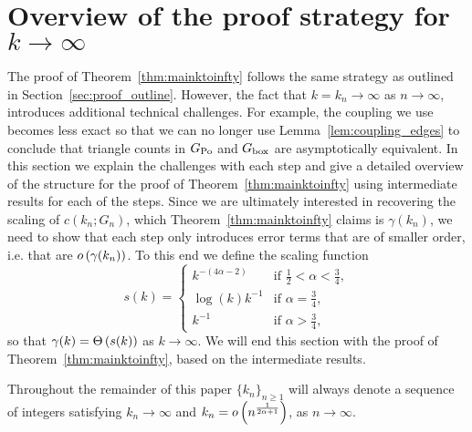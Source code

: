 
\section{Overview of the proof strategy for $k \to \infty$}


The proof of Theorem~\ref{thm:mainktoinfty} follows the same strategy as outlined in Section~\ref{sec:proof_outline}. However, the fact that $k = k_n \to \infty$ as $n \to \infty$, introduces additional technical challenges. For example, the coupling we use becomes less exact so that we can no longer use Lemma~\ref{lem:coupling_edges} to conclude that triangle counts in $G_{\text{Po}}$ and $G_{\text{box}}$ are asymptotically equivalent. In this section we explain the challenges with each step and give a detailed overview of the structure for the proof of Theorem~\ref{thm:mainktoinfty} using intermediate results for each of the steps. Since we are ultimately interested in recovering the scaling of $c(k_n;G_n)$, which Theorem~\ref{thm:mainktoinfty} claims is $\gamma(k_n)$, we need to show that each step only introduces error terms that are of smaller order, i.e. that are $o\left(\gamma(k_n)\right)$. To this end we define the scaling function
\begin{equation}\label{eq:def_scaling_function}
	s(k) = \begin{cases}
		k^{-(4\alpha - 2)} &\mbox{if } \frac{1}{2} < \alpha < \frac{3}{4},\\
		\log(k) k^{-1} &\mbox{if } \alpha = \frac{3}{4},\\
		k^{-1} &\mbox{if } \alpha > \frac{3}{4},
	\end{cases}
\end{equation}
so that $\gamma(k) = \Theta\left(s(k)\right)$ as $k \to \infty$. We will end this section with the proof of Theorem~\ref{thm:mainktoinfty}, based on the intermediate results.

\begin{remark}[Diverging $k_n$]
Throughout the remainder of this paper $\{k_n\}_{n \ge 1}$ will always denote a sequence of integers satisfying $k_n \to \infty$ and $k_n = o\left(n^{\frac{1}{2\alpha + 1}}\right)$, as $n \to \infty$.
\end{remark}


